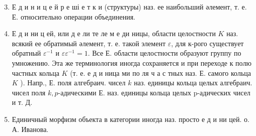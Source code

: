 \documentclass[10pt]{article}
\begin{document}
\begin{enumerate}

  \setcounter{enumi}{2}

  \item Е д и н и ц е й р е ші е т к и (структуры) наз. ее наибольший әлемент, т. е. Е. относительно операции объединения.



  \item Е д и ни ц ей, или д е ли те ле м е ди ницы, области целостности $K$ наз. всякий ее обратимый әлемент, т. е. такой элемент $\varepsilon$, для к-рого существует обратный $\varepsilon^{-1}$ и $\varepsilon \varepsilon^{-1}=1$. Все Е. области целостности образуют группу по умножению. Эта же терминология иногда сохраняется и при переходе к полю частных кольца $K$ (т. е. е д и ница ми по ля ч а с тных наз. Е. самого кольца $K$ ). Напр., Е. поля алгебраич. чисел $k$ наз. единицы кольца целых алгебраич. чисел поля $k, p$-адическими Е. наз. единицы кольца целых p-адических чисел и т. Д.



  \item Единичный морфизм объекта в категории иногда наз. просто е д и ни цей. о. А. Иванова.



\end{enumerate}
\end{document}
